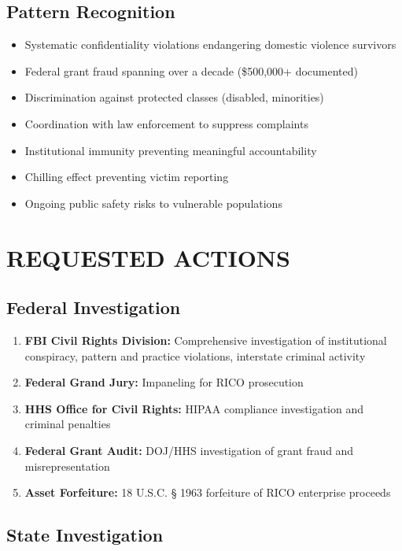 \documentclass[12pt,oneside]{article}
\begin{document}
\subsection*{Pattern Recognition}

\begin{itemize}
\item Systematic confidentiality violations endangering domestic violence survivors
\item Federal grant fraud spanning over a decade (\$500,000+ documented)
\item Discrimination against protected classes (disabled, minorities)
\item Coordination with law enforcement to suppress complaints
\item Institutional immunity preventing meaningful accountability
\item Chilling effect preventing victim reporting
\item Ongoing public safety risks to vulnerable populations
\end{itemize}

\section*{REQUESTED ACTIONS}

\subsection*{Federal Investigation}

\begin{enumerate}
\item \textbf{FBI Civil Rights Division:} Comprehensive investigation of institutional conspiracy, pattern and practice violations, interstate criminal activity
\item \textbf{Federal Grand Jury:} Impaneling for RICO prosecution
\item \textbf{HHS Office for Civil Rights:} HIPAA compliance investigation and criminal penalties
\item \textbf{Federal Grant Audit:} DOJ/HHS investigation of grant fraud and misrepresentation
\item \textbf{Asset Forfeiture:} 18 U.S.C. § 1963 forfeiture of RICO enterprise proceeds
\end{enumerate}

\subsection*{State Investigation}
\end{document}
